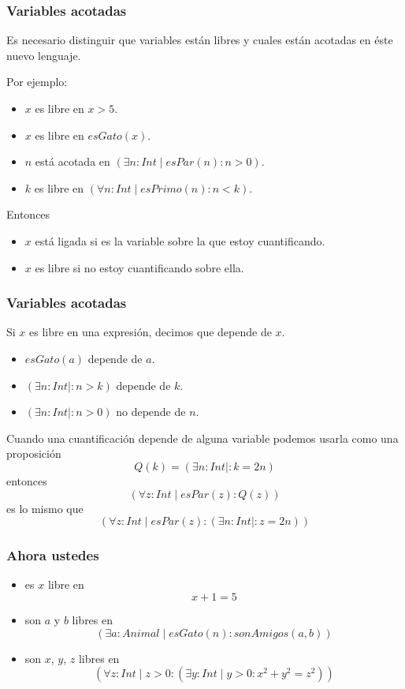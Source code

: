 \documentclass{beamer}
\begin{document}
\begin{frame}[fragile]
    \frametitle{Variables acotadas}
    Es necesario distinguir que variables están libres y cuales están acotadas en éste nuevo lenguaje.

    Por ejemplo:
    \begin{itemize}
        \item $x$ es libre en $x > 5$.
        \item $x$ es libre en $esGato(x)$.
        \item $n$ está acotada en $(\exists n: Int \mid esPar(n) : n > 0)$.
        \item $k$ es libre en $(\forall n: Int \mid esPrimo(n) : n < k)$.
    \end{itemize}

    Entonces
    \begin{itemize}
        \item $x$ está ligada si es la variable sobre la que estoy cuantificando.
        \item $x$ es libre si no estoy cuantificando sobre ella.
    \end{itemize}
\end{frame}

\begin{frame}[fragile]
    \frametitle{Variables acotadas} 
    Si $x$ es libre en una expresión, decimos que depende de $x$.
    \begin{itemize}
        \item $esGato(a)$ depende de $a$.
        \item $(\exists n: Int \mid : n > k)$ depende de $k$.
        \item $(\exists n: Int \mid : n > 0)$ no depende de $n$.
    \end{itemize}
    Cuando una cuantificación depende de alguna variable podemos usarla como una proposición
        $$Q(k) = (\exists n: Int \mid : k = 2n)$$
    entonces
        $$(\forall z: Int \mid esPar(z) : Q(z))$$
    es lo mismo que
        $$(\forall z: Int \mid esPar(z) : (\exists n: Int \mid : z = 2n))$$
\end{frame}

\begin{frame}[fragile]
    \frametitle{Ahora ustedes}
    \begin{itemize}
        \item es $x$ libre en
            $$x + 1 = 5$$
        \item son $a$ y $b$ libres en 
            $$(\exists a: Animal \mid esGato(n) : sonAmigos(a,b))$$
        \item son $x$, $y$, $z$ libres en 
            $$(\forall z: Int \mid z > 0 : (\exists y: Int \mid y > 0 : x^2+y^2=z^2))$$
    \end{itemize}
\end{frame}
\end{document}
